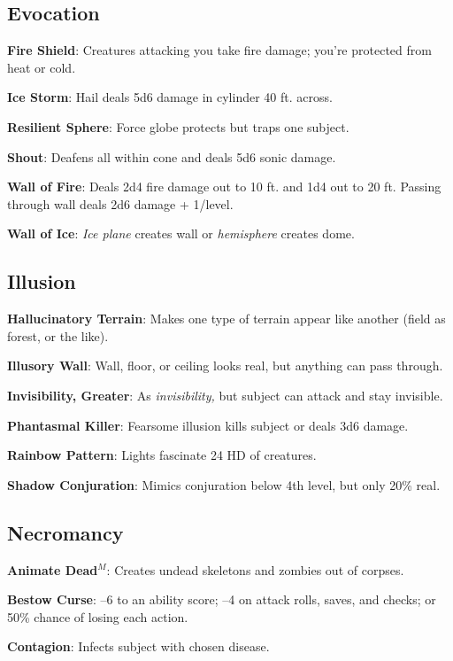 \subsection{Evocation}


\textbf{Fire Shield}: Creatures attacking you take fire damage; you're protected from heat or cold.

\textbf{Ice Storm}: Hail deals 5d6 damage in cylinder 40 ft. across.

\textbf{Resilient Sphere}: Force globe protects but traps one subject.

\textbf{Shout}: Deafens all within cone and deals 5d6 sonic damage.

\textbf{Wall of Fire}: Deals 2d4 fire damage out to 10 ft. and 1d4 out to 20 ft. Passing through wall deals 2d6 damage + 1/level.

\textbf{Wall of Ice}: \textit{Ice plane }creates wall or \textit{hemisphere }creates dome.

\subsection{Illusion}


\textbf{Hallucinatory Terrain}: Makes one type of terrain appear like another (field as forest, or the like).

\textbf{Illusory Wall}: Wall, floor, or ceiling looks real, but anything can pass through.

\textbf{Invisibility, Greater}: As \textit{invisibility, }but subject can attack and stay invisible.

\textbf{Phantasmal Killer}: Fearsome illusion kills subject or deals 3d6 damage.

\textbf{Rainbow Pattern}: Lights fascinate 24 HD of creatures.

\textbf{Shadow Conjuration}: Mimics conjuration below 4th level, but only 20\% real.

\subsection{Necromancy}


\textbf{Animate Dead}\(^{M}\): Creates undead skeletons and zombies out of corpses.

\textbf{Bestow Curse}: --6 to an ability score; --4 on attack rolls, saves, and checks; or 50\% chance of losing each action.

\textbf{Contagion}: Infects subject with chosen disease.

